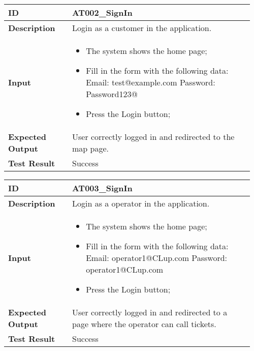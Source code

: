 \begin{table}[H]
	\centering
	\begin{tabular}{@{}p{0.25\linewidth}p{0.71\linewidth}@{}}
		\toprule
		\textbf{ID} & AT002\_SignIn \\
		\midrule
		\textbf{Description} & Login as a customer in the application. \\
		\midrule
		\textbf{Input} & \begin{itemize}[leftmargin=.4cm,noitemsep,topsep=0pt,before=\vspace{-3mm},after=\vspace{-4mm}]
			\item The system shows the home page;
			\item Fill in the form with the following data:\newline
			Email: test@example.com\newline
			Password: Password123@
			\item Press the Login button;
		\end{itemize}\\
		\midrule
		\textbf{Expected Output} & User correctly logged in and redirected to the map page.\\
		\midrule
		\textbf{Test Result} & Success\\
		\bottomrule
	\end{tabular}
\end{table}

\begin{table}[H]
	\centering
	\begin{tabular}{@{}p{0.25\linewidth}p{0.71\linewidth}@{}}
		\toprule
		\textbf{ID} & AT003\_SignIn \\
		\midrule
		\textbf{Description} & Login as a operator in the application. \\
		\midrule
		\textbf{Input} & \begin{itemize}[leftmargin=.4cm,noitemsep,topsep=0pt,before=\vspace{-3mm},after=\vspace{-4mm}]
			\item The system shows the home page;
			\item Fill in the form with the following data:\newline
			Email: operator1@CLup.com\newline
			Password: operator1@CLup.com
			\item Press the Login button;
		\end{itemize}\\
		\midrule
		\textbf{Expected Output} & User correctly logged in and redirected to a page where the operator can call tickets.\\
		\midrule
		\textbf{Test Result} & Success\\
		\bottomrule
	\end{tabular}
\end{table}

